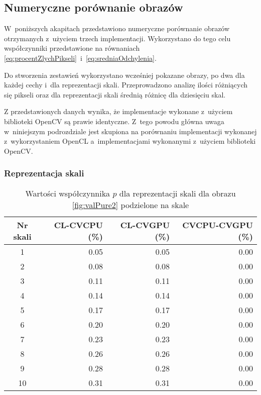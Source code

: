 \subsection{Numeryczne porównanie obrazów}
\label{subsec:porownanieNumerycznePoprawnosc}

W~poniższych akapitach przedstawiono numeryczne porównanie obrazów otrzymanych z~użyciem trzech implementacji. Wykorzystano do tego celu współczynniki przedstawione na równaniach \eqref{eq:procentZlychPikseli}~i~\eqref{eq:sredniaOdchylenia}.

Do stworzenia zestawień wykorzystano wcześniej pokazane obrazy, po dwa dla każdej cechy i~dla reprezentacji skali. Przeprowadzono analizę ilości różniących się pikseli oraz dla reprezentacji skali średnią różnicę dla dziesięciu skal. 

Z przedstawionych danych wynika, że implementacje wykonane z~użyciem biblioteki OpenCV są prawie identyczne. Z~tego powodu główna uwaga w~niniejszym podrozdziale jest skupiona na porównaniu implementacji wykonanej z~wykorzystaniem OpenCL a~implementacjami wykonanymi z~użyciem biblioteki OpenCV.

\subsubsection{Reprezentacja skali}
\label{subsubsec:reprezentacjaSakliTabele}

\begin{center}
\begin{table}
\centering
\caption{Wartości współczynnika $ p $ dla reprezentacji skali dla obrazu \ref{fig:valPure2} podzielone na skale}
\label{tab:imageScaleRep2}
\begin{tabular}{|c|r|r|r|}
 \hline
Nr skali & CL-CVCPU (\%) & CL-CVGPU (\%) & CVCPU-CVGPU (\%) \\ \hline
1        & 0.05     & 0.05     & 0.00        \\ \hline
2        & 0.08     & 0.08     & 0.00        \\ \hline
3        & 0.11     & 0.11     & 0.00        \\ \hline
4        & 0.14     & 0.14     & 0.00        \\ \hline
5        & 0.17     & 0.17     & 0.00        \\ \hline
6        & 0.20     & 0.20     & 0.00        \\ \hline
7        & 0.23     & 0.23     & 0.00        \\ \hline
8        & 0.26     & 0.26     & 0.00        \\ \hline
9        & 0.28     & 0.28     & 0.00        \\ \hline
10       & 0.31     & 0.31     & 0.00        \\ \hline
\end{tabular}
\end{table}
\end{center}

